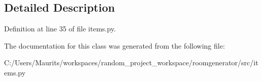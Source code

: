 \subsection{Detailed Description}


Definition at line 35 of file items.\+py.



The documentation for this class was generated from the following file\+:\begin{DoxyCompactItemize}
\item 
C\+:/\+Users/\+Maurits/workspaces/random\+\_\+project\+\_\+workspace/roomgenerator/src/items.\+py\end{DoxyCompactItemize}

